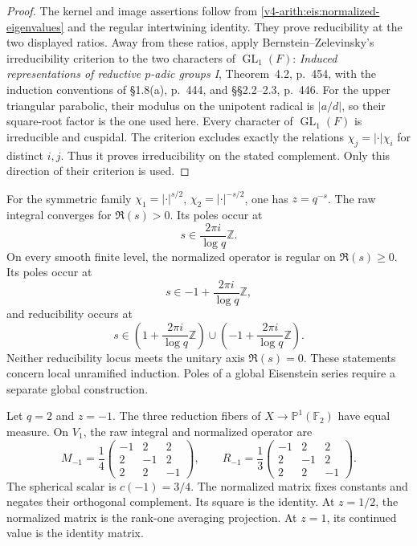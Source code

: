 \begin{proof}
The kernel and image assertions follow from
\eqref{v4-arith:eis:normalized-eigenvalues} and the regular intertwining
identity.
They prove reducibility at the two displayed ratios.
Away from these ratios, apply Bernstein--Zelevinsky's irreducibility
criterion to the two characters of $\operatorname{GL}_1(F)$:
\emph{Induced representations of reductive $p$-adic groups I},
Theorem~4.2, p.~454, with the induction conventions of
\S1.8(a), p.~444, and \S\S2.2--2.3, p.~446.
For the upper triangular parabolic, their modulus on the unipotent
radical is $|a/d|$, so their square-root factor is the one used here.
Every character of $\operatorname{GL}_1(F)$ is irreducible and cuspidal.
The criterion excludes exactly the relations
$\chi_j=|\cdot|\chi_i$ for distinct $i,j$.
Thus it proves irreducibility on the stated complement.
Only this direction of their criterion is used.
\end{proof}

For the symmetric family
$\chi_1=|\cdot|^{s/2}$, $\chi_2=|\cdot|^{-s/2}$, one has $z=q^{-s}$.
The raw integral converges for $\Re(s)>0$.
Its poles occur at
\[
 s\in\frac{2\pi i}{\log q}\mathbb Z.
\]
On every smooth finite level, the normalized operator is regular on
$\Re(s)\ge0$.
Its poles occur at
\[
 s\in-1+\frac{2\pi i}{\log q}\mathbb Z,
\]
and reducibility occurs at
\[
 s\in\left(1+\frac{2\pi i}{\log q}\mathbb Z\right)
 \cup\left(-1+\frac{2\pi i}{\log q}\mathbb Z\right).
\]
Neither reducibility locus meets the unitary axis $\Re(s)=0$.
These statements concern local unramified induction.
Poles of a global Eisenstein series require a separate global construction.

\begin{example}
Let $q=2$ and $z=-1$.
The three reduction fibers of $X\to\mathbb P^1(\mathbb F_2)$ have equal measure.
On $V_1$, the raw integral and normalized operator are
\[
 M_{-1}=\frac14
 \begin{pmatrix}-1&2&2\\2&-1&2\\2&2&-1\end{pmatrix},
 \qquad
 R_{-1}=\frac13
 \begin{pmatrix}-1&2&2\\2&-1&2\\2&2&-1\end{pmatrix}.
\]
The spherical scalar is $c(-1)=3/4$.
The normalized matrix fixes constants and negates their orthogonal complement.
Its square is the identity.
At $z=1/2$, the normalized matrix is the rank-one averaging projection.
At $z=1$, its continued value is the identity matrix.
\end{example}

